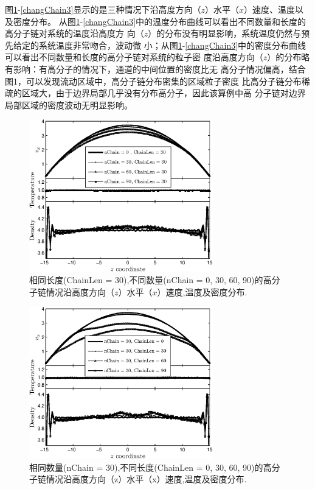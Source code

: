\documentclass[twoside,12pt]{article}
\begin{document}
图\ref{changChain1}-\ref{changChain3}显示的是三种情况下沿高度方向（$z$）水平（$x$）速度、温度以及密度分布。
从图\ref{changChain1}-\ref{changChain3}中的温度分布曲线可以看出不同数量和长度的高分子链对系统的温度沿高度方
向（$z$）的分布没有明显影响，系统温度仍然与预先给定的系统温度非常吻合，波动微
小；从图\ref{changChain1}-\ref{changChain3}中的密度分布曲线可以看出不同数量和长度的高分子链对系统的粒子密
度沿高度方向（$z$）的分布略有影响：有高分子的情况下，通道的中间位置的密度比无
高分子情况偏高，结合图1，可以发现流动区域中，高分子链分布密集的区域粒子密度
比高分子链分布稀疏的区域大，由于边界局部几乎没有分布高分子，因此该算例中高
分子链对边界局部区域的密度波动无明显影响。

\begin{figure}[!htb]
\centering
\includegraphics[width=8cm]{./figures/changChain1.eps}
\caption{\label{changChain1}\small 相同长度(ChainLen = 30),不同数量(nChain = 0, 30, 60, 90)的高分子链情况沿高度方向（$z$）水平（$x$）速度,温度及密度分布.}
\end{figure}

\begin{figure}[!htb]
\centering
\includegraphics[width=8cm]{./figures/changChain2.eps}
\caption{\label{changChain2}\small
相同数量(nChain = 30),不同长度(ChainLen = 0, 30, 60, 90)的高分子链情况沿高度方向（z）水平（x）速度,温度及密度分布.}
\end{figure}
\end{document}
